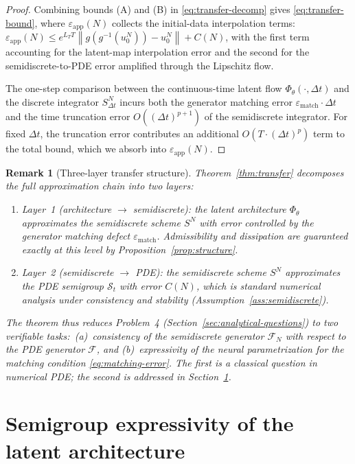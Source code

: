 \documentclass[11pt]{article}
\newtheorem{remark}{Remark}
\newcommand{\cS}{\mathcal{S}}
\newcommand{\cF}{\mathcal{F}}
\newcommand{\cFN}{\mathcal{F}_N}
\newcommand{\PhiT}{\Phi_{\theta}}
\newcommand{\norm}[1]{\left\lVert #1 \right\rVert}
\begin{document}
\begin{proof}
Combining bounds (A) and (B) in \eqref{eq:transfer-decomp} gives \eqref{eq:transfer-bound}, where $\varepsilon_{\mathrm{app}}(N)$ collects the initial-data interpolation terms: $\varepsilon_{\mathrm{app}}(N)\le e^{L_TT}\norm{g(g^{-1}(u_0^N))-u_0^N}+C(N)$, with the first term accounting for the latent-map interpolation error and the second for the semidiscrete-to-PDE error amplified through the Lipschitz flow.

The one-step comparison between the continuous-time latent flow $\PhiT(\cdot,\Delta t)$ and the discrete integrator $S^N_{\Delta t}$ incurs both the generator matching error $\varepsilon_{\mathrm{match}}\cdot\Delta t$ and the time truncation error $O((\Delta t)^{p+1})$ of the semidiscrete integrator. For fixed $\Delta t$, the truncation error contributes an additional $O(T\cdot(\Delta t)^p)$ term to the total bound, which we absorb into $\varepsilon_{\mathrm{app}}(N)$.
\end{proof}

\begin{remark}[Three-layer transfer structure]\label{rem:transfer-interpretation}
Theorem~\ref{thm:transfer} decomposes the full approximation chain into two layers:
\begin{enumerate}[label=(\alph*)]
    \item \emph{Layer~1 (architecture $\to$ semidiscrete):} the latent architecture $\PhiT$ approximates the semidiscrete scheme $S^N$ with error controlled by the generator matching defect $\varepsilon_{\mathrm{match}}$. Admissibility and dissipation are guaranteed exactly at this level by Proposition~\ref{prop:structure}.
    \item \emph{Layer~2 (semidiscrete $\to$ PDE):} the semidiscrete scheme $S^N$ approximates the PDE semigroup $\cS_t$ with error $C(N)$, which is standard numerical analysis under consistency and stability (Assumption~\ref{ass:semidiscrete}).
\end{enumerate}
The theorem thus reduces Problem~4 (Section~\ref{sec:analytical-questions}) to two verifiable tasks:~(a)~consistency of the semidiscrete generator $\cFN$ with respect to the PDE generator $\cF$, and (b)~expressivity of the neural parametrization for the matching condition \eqref{eq:matching-error}. The first is a classical question in numerical PDE; the second is addressed in Section~\ref{sec:expressivity}.
\end{remark}

\section{Semigroup expressivity of the latent architecture}\label{sec:expressivity}
\end{document}
